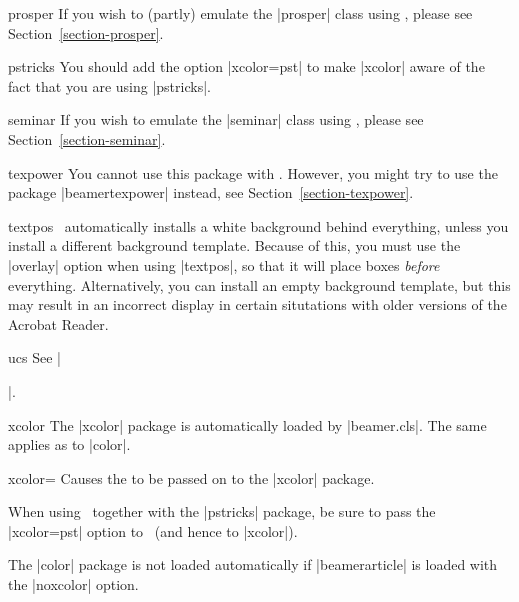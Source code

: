 \begin{class}{{prosper}}
  If you wish to (partly) emulate the |prosper| class using \beamer,
  please see Section~\ref{section-prosper}.
\end{class}

\begin{package}{{pstricks}}
  You should add the option |xcolor=pst| to make |xcolor| aware of the
  fact that you are using |pstricks|.
\end{package}

\begin{class}{{seminar}}
  If you wish to emulate the |seminar| class using \beamer, please see
  Section~\ref{section-seminar}.
\end{class}

\begin{package}{{texpower}}
  You cannot use this package with \beamer. However, you might try to
  use the package |beamertexpower| instead, see
  Section~\ref{section-texpower}.  
\end{package}

\begin{package}{{textpos}}
  \beamernote
  \beamer\ automatically installs a white background behind
  everything, unless you install a different background
  template. Because of this, you must use the |overlay| option when
  using |textpos|, so that it will place boxes \emph{before}
  everything. Alternatively, you can install an empty background
  template, but this may result in an incorrect display in certain
  situtations with older versions of the Acrobat Reader. 
\end{package}

\begin{package}{{ucs}}
  See |\usepackage[utf8]{inputenc}|.
\end{package}


\begin{package}{{xcolor}}
  \beamernote
  The |xcolor| package is automatically loaded by |beamer.cls|. The
  same applies as to |color|.

  \begin{classoption}{xcolor={\normalfont{}}}
    Causes the  to be passed on to the |xcolor|
    package.
  \end{classoption}

  When using \beamer\ together with the |pstricks| package, be sure to
  pass the |xcolor=pst| option to \beamer\ (and hence to |xcolor|).

  \articlenote
  The |color| package is not loaded automatically if
  |beamerarticle| is loaded with the |noxcolor| option.
\end{package}




